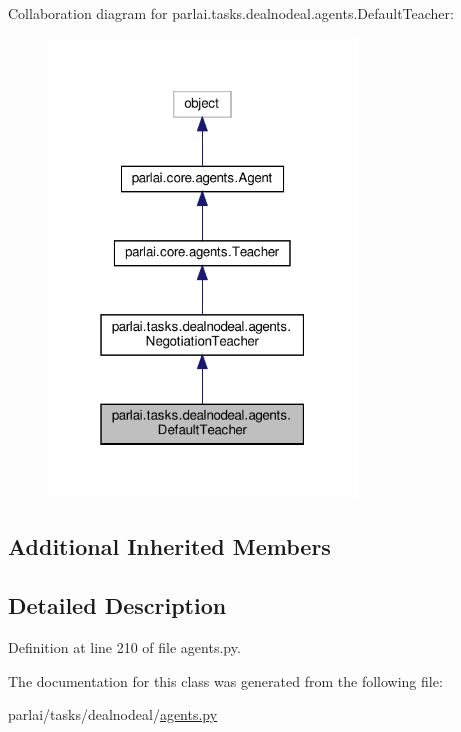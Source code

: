 Collaboration diagram for parlai.\+tasks.\+dealnodeal.\+agents.\+Default\+Teacher\+:
\nopagebreak
\begin{figure}[H]
\begin{center}
\leavevmode
\includegraphics[width=232pt]{classparlai_1_1tasks_1_1dealnodeal_1_1agents_1_1DefaultTeacher__coll__graph}
\end{center}
\end{figure}
\subsection*{Additional Inherited Members}


\subsection{Detailed Description}


Definition at line 210 of file agents.\+py.



The documentation for this class was generated from the following file\+:\begin{DoxyCompactItemize}
\item 
parlai/tasks/dealnodeal/\hyperlink{parlai_2tasks_2dealnodeal_2agents_8py}{agents.\+py}\end{DoxyCompactItemize}
